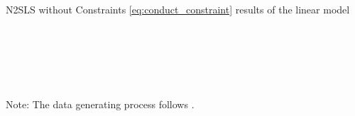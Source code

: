 \documentclass[11pt, a4paper]{article}
\theoremstyle{remark}
\begin{document}
\begin{table}[!htbp]
  \begin{center}
  \caption{N2SLS without Constraints \eqref{eq:conduct_constraint} results of the linear model}
  \label{tb:linear_linear_sigma_1} 

  \\[0.5em]
  \begin{adjustbox}{width=0.95\textwidth}
    
  \end{adjustbox}

  \vspace{1em}

  \\[0.5em]
  \begin{adjustbox}{width=0.95\textwidth}
    
  \end{adjustbox}

  \vspace{1em}

  \\[0.5em]
  \begin{adjustbox}{width=0.95\textwidth}
    
  \end{adjustbox}
        \end{center}
  \footnotesize
  Note: The data generating process follows \cite{matsumura2023resolving}.
\end{table}

\end{document}
